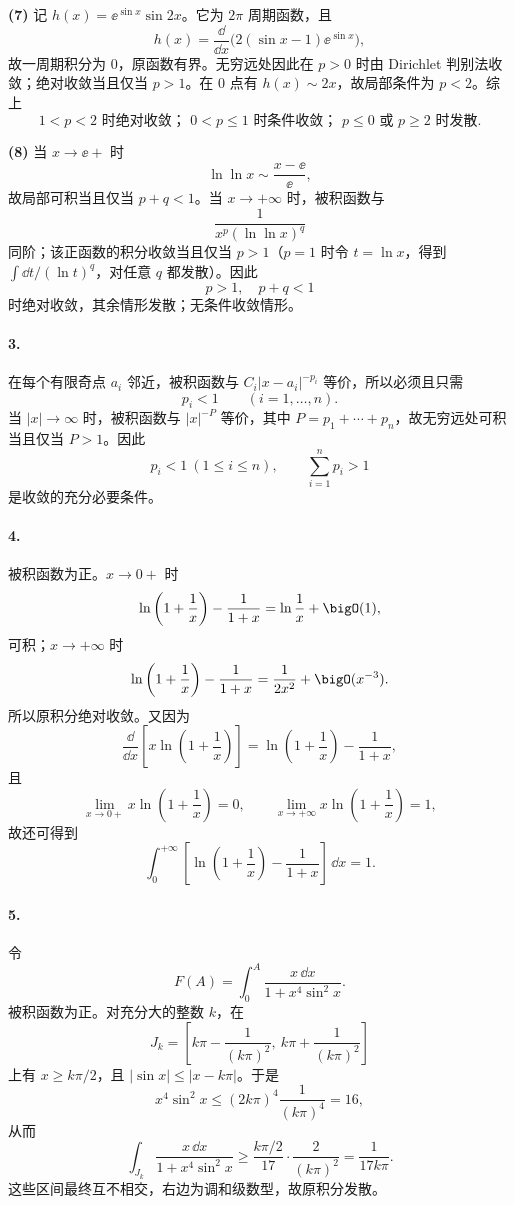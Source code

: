 \textbf{(7)} 记 $h(x)=\ee^{\sin x}\sin2x$。它为 $2\pi$ 周期函数，且
\[
  h(x)=\frac{\dd}{\dd x}\bigl(2(\sin x-1)\ee^{\sin x}\bigr),
\]
故一周期积分为 $0$，原函数有界。无穷远处因此在 $p>0$ 时由 Dirichlet 判别法收敛；绝对收敛当且仅当 $p>1$。在 $0$ 点有 $h(x)\sim2x$，故局部条件为 $p<2$。综上
\[
  \boxed{1<p<2\text{ 时绝对收敛； }0<p\leq1\text{ 时条件收敛； }p\leq0\text{ 或 }p\geq2\text{ 时发散}.}
\]

\textbf{(8)} 当 $x\to\ee+$ 时
\[
  \ln\ln x\sim\frac{x-\ee}{\ee},
\]
故局部可积当且仅当 $p+q<1$。当 $x\to+\infty$ 时，被积函数与
\[
  \frac1{x^p(\ln\ln x)^q}
\]
同阶；该正函数的积分收敛当且仅当 $p>1$（$p=1$ 时令 $t=\ln x$，得到 $\int\dd t/(\ln t)^q$，对任意 $q$ 都发散）。因此
\[
  \boxed{p>1,\quad p+q<1}
\]
时绝对收敛，其余情形发散；无条件收敛情形。

\paragraph{3.}
在每个有限奇点 $a_i$ 邻近，被积函数与 $C_i|x-a_i|^{-p_i}$ 等价，所以必须且只需
\[
  p_i<1\qquad(i=1,\ldots,n).
\]
当 $|x|\to\infty$ 时，被积函数与 $|x|^{-P}$ 等价，其中 $P=p_1+\cdots+p_n$，故无穷远处可积当且仅当 $P>1$。因此
\[
  \boxed{p_i<1\ (1\leq i\leq n),\qquad \sum_{i=1}^n p_i>1}
\]
是收敛的充分必要条件。

\paragraph{4.}
被积函数为正。$x\to0+$ 时
\[
  \ln\left(1+\frac1x\right)-\frac1{1+x}
  =\ln\frac1x+\bigO(1),
\]
可积；$x\to+\infty$ 时
\[
  \ln\left(1+\frac1x\right)-\frac1{1+x}
  =\frac1{2x^2}+\bigO(x^{-3}).
\]
所以原积分绝对收敛。又因为
\[
  \frac{\dd}{\dd x}\left[x\ln\left(1+\frac1x\right)\right]
  =\ln\left(1+\frac1x\right)-\frac1{1+x},
\]
且
\[
  \lim_{x\to0+}x\ln\left(1+\frac1x\right)=0,
  \qquad
  \lim_{x\to+\infty}x\ln\left(1+\frac1x\right)=1,
\]
故还可得到
\[
  \int_0^{+\infty}\left[\ln\left(1+\frac1x\right)-\frac1{1+x}\right]\,\dd x=\boxed{1}.
\]

\paragraph{5.}
令
\[
  F(A)=\int_0^A\frac{x\,\dd x}{1+x^4\sin^2x}.
\]
被积函数为正。对充分大的整数 $k$，在
\[
  J_k=\left[k\pi-\frac1{(k\pi)^2},\ k\pi+\frac1{(k\pi)^2}\right]
\]
上有 $x\geq k\pi/2$，且 $|\sin x|\leq|x-k\pi|$。于是
\[
  x^4\sin^2x\leq (2k\pi)^4\frac1{(k\pi)^4}=16,
\]
从而
\[
  \int_{J_k}\frac{x\,\dd x}{1+x^4\sin^2x}
  \geq \frac{k\pi/2}{17}\cdot\frac{2}{(k\pi)^2}
  =\frac1{17k\pi}.
\]
这些区间最终互不相交，右边为调和级数型，故原积分发散。

